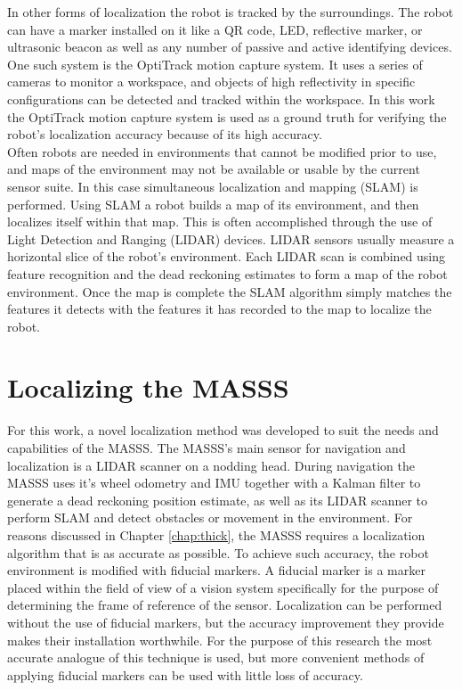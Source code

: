 In other forms of localization the robot is tracked by the surroundings. The robot can have a marker installed on it like a QR code, LED, reflective marker, or ultrasonic beacon as well as any number of passive and active identifying devices. One such system is the OptiTrack motion capture system. It uses a series of cameras to monitor a workspace, and objects of high reflectivity in specific configurations can be detected and tracked within the workspace. In this work the OptiTrack motion capture system is used as a ground truth for verifying the robot's localization accuracy because of its high accuracy.\\

Often robots are needed in environments that cannot be modified prior to use, and maps of the environment may not be available or usable by the current sensor suite. In this case simultaneous localization and mapping (SLAM) is performed. Using SLAM a robot builds a map of its environment, and then localizes itself within that map. This is often accomplished through the use of Light Detection and Ranging (LIDAR) devices. LIDAR sensors usually measure a horizontal slice of the robot's environment. Each LIDAR scan is combined using feature recognition and the dead reckoning estimates to form a map of the robot environment. Once the map is complete the SLAM algorithm simply matches the features it detects with the features it has recorded to the map to localize the robot.\\

\section{Localizing the MASSS}

For this work, a novel localization method was developed to suit the needs and capabilities of the MASSS. The MASSS's main sensor for navigation and localization is a LIDAR scanner on a nodding head. During navigation the MASSS uses it's wheel odometry and IMU together with a Kalman filter to generate a dead reckoning position estimate, as well as its LIDAR scanner to perform SLAM and detect obstacles or movement in the environment. For reasons discussed in Chapter \ref{chap:thick}, the MASSS requires a localization algorithm that is as accurate as possible. To achieve such accuracy, the robot environment is modified with fiducial markers. A fiducial marker is a marker placed within the field of view of a vision system specifically for the purpose of determining the frame of reference of the sensor. Localization can be performed without the use of fiducial markers, but the accuracy improvement they provide makes their installation worthwhile. For the purpose of this research the most accurate analogue of this technique is used, but more convenient methods of applying fiducial markers can be used with little loss of accuracy.\\

